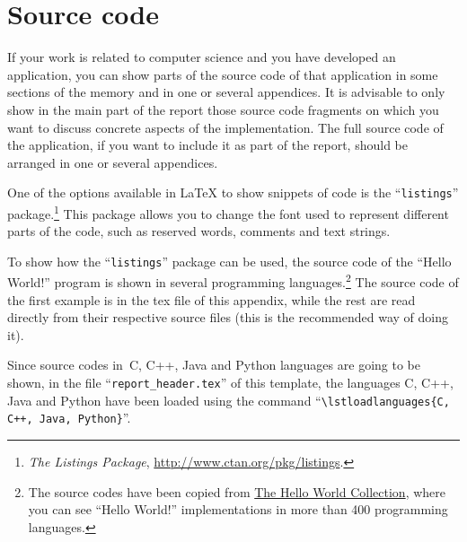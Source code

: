 %
%
%

\chapter{Source code}
\label{sec:codigo_fuente}

If your work is related to computer science and you have developed an application, you can show parts of the source code of that application in some sections of the memory and in one or several appendices. It is advisable to only show in the main part of the report those source code fragments on which you want to discuss concrete aspects of the implementation. The full source  code of the application, if you want to include it as part of the report, should be arranged in one or several appendices.

One of the options available in \LaTeX{} to show snippets of code is the ``\texttt{listings}'' package.\footnote{\emph{The Listings Package}, \url{http://www.ctan.org/pkg/listings}.} This package allows you to change the font used to represent different parts of the code, such as reserved words, comments and text strings.

To show how the ``\texttt{listings}'' package can be used, the source code of the ``Hello World!'' program is shown in several programming languages.\footnote{The source codes have been copied from \href{http://www.roesler-ac.de/wolfram/hello.htm}{The Hello World Collection}, where you can see ``Hello World!'' implementations in more than 400 programming languages.} The source code of the first example is in the tex file of this appendix, while the rest are read directly from their respective source files (this is the recommended way of doing it).

Since source codes in~C, C++, Java and Python languages are going to be
shown, in the file ``\texttt{report\_header.tex}'' of this template, the
languages C, C++, Java and Python have been loaded using the command
``\verb|\lstloadlanguages{C, C++, Java, Python}|''.


